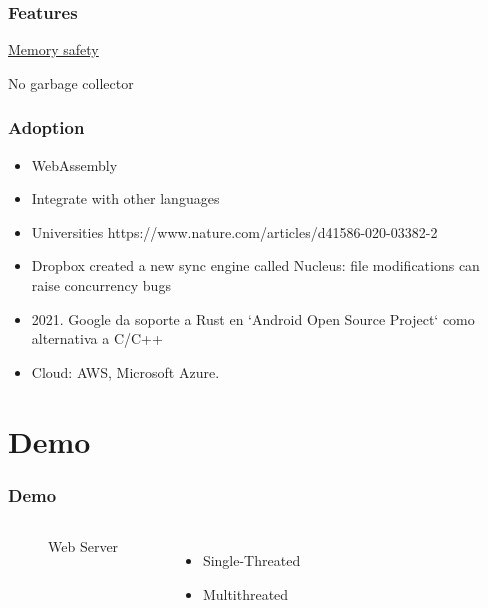 \documentclass{beamer}
\begin{document}
\begin{frame}
\frametitle{Features}
\underline{Memory safety}

No garbage collector

\end{frame}

\begin{frame}
\frametitle{Adoption}
\begin{itemize}
\item WebAssembly
\item Integrate with other languages
\item Universities https://www.nature.com/articles/d41586-020-03382-2
\item Dropbox created a new sync engine called Nucleus: file modifications can raise concurrency bugs
\item 2021. Google da soporte a Rust en `Android Open Source Project` como alternativa a C/C++
\item Cloud: AWS, Microsoft Azure.
\end{itemize}

\end{frame}

\section{Demo}

\begin{frame}
\frametitle{Demo}

\begin{columns}[c] %

  \begin{figure}
    \centering
  \caption{Web Server}
  \end{figure}

\begin{itemize}
\item Single-Threated
\item Multithreated
\end{itemize}

\end{columns}

\end{frame}
\end{document}
